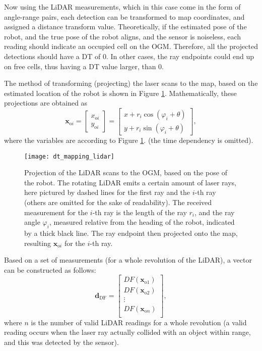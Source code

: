 Now using the LiDAR measurements, which in this case come in the form of angle-range pairs,
each detection can be transformed to map coordinates, and assigned a distance transform value.
Theoretically, if the estimated pose of the robot, and the true pose of the robot aligns,
and the sensor is noiseless, each reading should indicate an occupied cell on the OGM.
Therefore, all the projected detections should have a DT of 0.
In other cases, the ray endpoints could end up on free cells, thus having a DT value larger,
than 0.

The method of transforming (projecting) the laser scans to the map, based on the estimated
location of the robot is shown in Figure \ref{fig:ogm-laser-projection}.
Mathematically, these projections are obtained as
\begin{equation}\label{eq:ray-projection}
    \mathbf{x}_{\mathrm{o}i} = \begin{bmatrix}x_{\mathrm{o}i}\\y_{\mathrm{o}i}\end{bmatrix}
    = \begin{bmatrix}x + r_i\cos(\varphi_i + \theta)\\y + r_i\sin(\varphi_i + \theta)\end{bmatrix},
\end{equation}
where the variables are according to Figure \ref{fig:ogm-laser-projection}. (the time dependency is omitted).
\begin{figure}[htbp]
    \centering
    \texttt{[image: dt\_mapping\_lidar]}
    \caption{Projection of the LiDAR scans to the OGM, based on the pose of the robot.
    The rotating LiDAR emits a certain amount of laser rays,
    here pictured by dashed lines for the first ray and the $i$-th ray
    (others are omitted for the sake of readability).
    The received measurement for the $i$-th ray is the length of the ray $r_i$,
    and the ray angle $\varphi_i$, measured relative from the heading of the robot,
    indicated by a thick black line.
    The ray endpoint then projected onto the map, resulting $\mathbf{x}_{\text{o}i}$ for the $i$-th ray.}
    \label{fig:ogm-laser-projection}
\end{figure}

Based on a set of measurements (for a whole revolution of the LiDAR), a vector can be constructed as follows:
\begin{equation}\label{eq:df-vector}
    \mathbf{d}_{\text{DF}} =
    \begin{bmatrix}
        DF(\mathbf{x}_{\text{o}1}) \\
        DF(\mathbf{x}_{\text{o}2}) \\
        \vdots                     \\
        DF(\mathbf{x}_{\text{o}n}) \\
    \end{bmatrix},
\end{equation}
where $n$ is the number of valid LiDAR readings for a whole revolution
(a valid reading occurs when the laser ray actually collided with an object within range, and this was
detected by the sensor).


